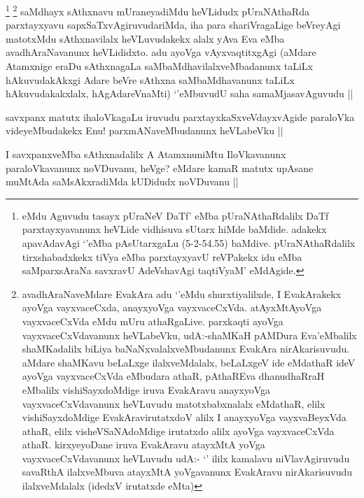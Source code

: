 \begin{artha}
\footnote[1]{\stext eMdu Aguvudu tasayx pUraNeV DaTf' eMba pUraNAthaRdalilx DaTf parxtayxyavanunx heVLide vidhisuva sUtarx hiMde baMdide. adakekx apavAdavAgi `\stext'eMba pAsUtarxgaLu (5-2-54.55) baMdive. pUraNAthaRdalilx tirxshabadxkekx tiVya eMba parxtayxyavU reVPakekx idu eMba saMparxsAraNa savxravU AdeVshavAgi taqtiVyaM' eMdAgide.}
\footnote[2]{avadhAraNaveMdare EvakAra adu `\stext'eMdu shurxtiyalilxde, I EvakArakekx ayoVga vayxvaceCxda, anayxyoVga vayxvaceCxVda. atAyxMtAyoVga vayxvaceCxVda eMdu mUru athaRgaLive. parxkaqti ayoVga vayxvaceCxVdavanunx heVLabeVku, udA:-shaMKaH pAMDura Eva'eMbalilx shaMKadalilx biLiya baNaNxvalalxveMbudanunx EvakAra nirAkarisuvudu. aMdare shaMKavu beLaLxge ilalxveMdalalx, beLaLxgeV ide eMdathaR ideV ayoVga vayxvaceCxVda eMbudara athaR, pAthaREva dhanudhaRraH eMbalilx vishiSayxdoMdige iruva EvakAravu anayxyoVga vayxvaceCxVdavanunx heVLuvudu matotxbabxnalalx eMdathaR, elilx vishiSayxdoMdige EvakAravirutatxdoV alilx I anayxyoVga vayxvaBeyxVda athaR, elilx visheVSaNAdoMdige irutatxdo alilx ayoVga vayxvaceCxVda athaR. kirxyeyoDane iruva EvakAravu atayxMtA yoVga vayxvaceCxVdavanunx heVLuvudu udA:- `\stext' ililx kamalavu niVlavAgiruvudu savaRthA ilalxveMbuva atayxMtA yoVgavanunx EvakAravu nirAkarisuvudu ilalxveMdalalx (idedxV irutatxde eMta)}
saMdhayx sAthxnavu mUraneyadiMdu heVLidudx pUraNAthaRda parxtayxyavu sapxSaTxvAgiruvudariMda, iha para shariVragaLige beVreyAgi matotxMdu sAthxnavilalx heVLuvudakekx alalx yAva Eva eMba avadhAraNavanunx heVLididxto. adu ayoVga vAyxvaqtitxgAgi (aMdare Atamxnige eraDu sAthxnagaLa saMbaMdhavilalxveMbadanunx taLiLx hAkuvudakAkxgi Adare beVre sAthxna saMbaMdhavanunx taLiLx hAkuvudakakxlalx, hAgAdareVnaMti) `\stext'eMbuvudU saha samaMjasavAguvudu ||
\end{artha}

\begin{artha}
savxpanx matutx ihaloVkagaLu iruvudu parxtayxkaSxveVdayxvAgide paraloVka videyeMbudakekx Enu! parxmANaveMbudanunx heVLabeVku ||
\end{artha}


\begin{artha}
I savxpanxveMba sAthxnadalilx A AtamxnuniMtu IloVkavanunx paraloVkavanunx noVDuvanu, heVge? eMdare kamaR matutx upAsane muMtAda saMsAkxradiMda kUDidudx noVDuvanu ||
\end{artha}


